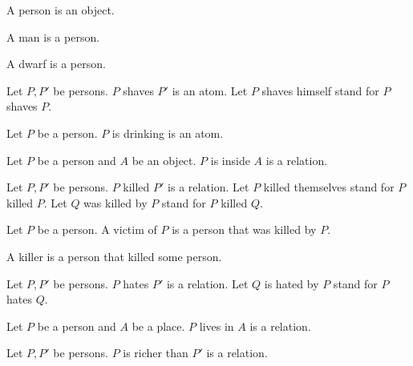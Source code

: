 \documentclass{article}
\begin{document}
\begin{forthel}
  \begin{signature*}
    A person is an object.
  \end{signature*}

  \begin{signature*}
    A man is a person.
  \end{signature*}

  \begin{signature*}
    A dwarf is a person.
  \end{signature*}

  \begin{signature*}
    Let $P, P'$ be persons.
    $P$ shaves $P'$ is an atom.
    Let $P$ shaves himself stand for $P$ shaves $P$.
  \end{signature*}

  \begin{signature*}
    Let $P$ be a person.
    $P$ is drinking is an atom.
  \end{signature*}

  \begin{signature*}
    Let $P$ be a person and $A$ be an object.
    $P$ is inside $A$ is a relation.
  \end{signature*}

  \begin{signature*}
    Let $P, P'$ be persons.
    $P$ killed $P'$ is a relation.
    Let $P$ killed themselves stand for $P$ killed $P$.
    Let $Q$ was killed by $P$ stand for $P$ killed $Q$.
  \end{signature*}

  \begin{definition*}
    Let $P$ be a person.
    A victim of $P$ is a person that was killed by $P$.
  \end{definition*}

  \begin{definition*}
    A killer is a person that killed some person.
  \end{definition*}

  \begin{signature*}
    Let $P, P'$ be persons.
    $P$ hates $P'$ is a relation.
    Let $Q$ is hated by $P$ stand for $P$ hates $Q$.
  \end{signature*}

  \begin{signature*}
    Let $P$ be a person and $A$ be a place.
    $P$ lives in $A$ is a relation.
  \end{signature*}

  \begin{signature*}
    Let $P, P'$ be persons.
    $P$ is richer than $P'$ is a relation.
  \end{signature*}
\end{forthel}
\end{document}
